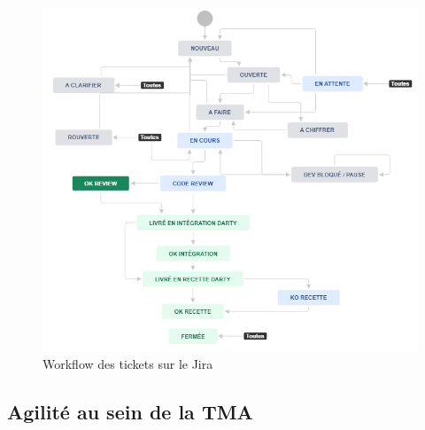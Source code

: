 \documentclass[12pt, a4paper]{report}
\begin{document}
	\begin{figure}[!h]
		\vspace{4cm}
		\centering
		\includegraphics[width=1\textwidth]{assets/images/workflow_jira.png}
		\caption{Workflow des tickets sur le Jira}
	\end{figure}

	\newpage
	\subsection{Agilité au sein de la TMA}
\end{document}
